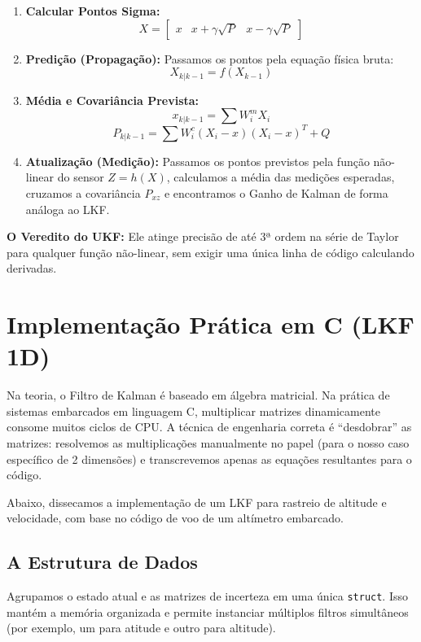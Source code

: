 \documentclass[12pt,a4paper]{article}
\begin{document}
\begin{enumerate}
    \item \textbf{Calcular Pontos Sigma:} 
    $$X = \begin{bmatrix} x & x + \gamma\sqrt{P} & x - \gamma\sqrt{P} \end{bmatrix}$$
    \item \textbf{Predição (Propagação):} Passamos os pontos pela equação física bruta:
    $$X_{k|k-1} = f(X_{k-1})$$ 
    \item \textbf{Média e Covariância Prevista:} 
    $$x_{k|k-1} = \sum W_i^m X_i$$ 
    $$P_{k|k-1} = \sum W_i^c (X_i - x)(X_i - x)^T + Q$$
    \item \textbf{Atualização (Medição):} Passamos os pontos previstos pela função não-linear do sensor $Z = h(X)$, calculamos a média das medições esperadas, cruzamos a covariância $P_{xz}$ e encontramos o Ganho de Kalman de forma análoga ao LKF.
\end{enumerate}

\textbf{O Veredito do UKF:} Ele atinge precisão de até 3ª ordem na série de Taylor para qualquer função não-linear, sem exigir uma única linha de código calculando derivadas. 

\section{Implementação Prática em C (LKF 1D)}

Na teoria, o Filtro de Kalman é baseado em álgebra matricial. Na prática de sistemas embarcados em linguagem C, multiplicar matrizes dinamicamente consome muitos ciclos de CPU. A técnica de engenharia correta é ``desdobrar'' as matrizes: resolvemos as multiplicações manualmente no papel (para o nosso caso específico de 2 dimensões) e transcrevemos apenas as equações resultantes para o código.

Abaixo, dissecamos a implementação de um LKF para rastreio de altitude e velocidade, com base no código de voo de um altímetro embarcado.

\subsection{A Estrutura de Dados}
Agrupamos o estado atual e as matrizes de incerteza em uma única \texttt{struct}. Isso mantém a memória organizada e permite instanciar múltiplos filtros simultâneos (por exemplo, um para atitude e outro para altitude).
\end{document}
